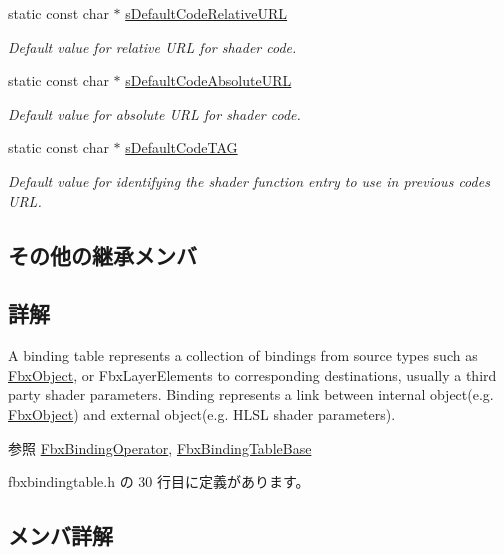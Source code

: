 \begin{DoxyCompactItemize}
static const char $\ast$ \hyperlink{class_fbx_binding_table_ac40c0a63d26e730175dfac64a58a8332}{s\+Default\+Code\+Relative\+U\+RL}
\begin{DoxyCompactList}\small\item\em Default value for relative U\+RL for shader code. \end{DoxyCompactList}\item 
static const char $\ast$ \hyperlink{class_fbx_binding_table_aa2ed12fb4230daa72892ec1ab6ee0c86}{s\+Default\+Code\+Absolute\+U\+RL}
\begin{DoxyCompactList}\small\item\em Default value for absolute U\+RL for shader code. \end{DoxyCompactList}\item 
static const char $\ast$ \hyperlink{class_fbx_binding_table_ac0dcff3f0d4d89f84814890e57e21452}{s\+Default\+Code\+T\+AG}
\begin{DoxyCompactList}\small\item\em Default value for identifying the shader function entry to use in previous code\textquotesingle{}s U\+RL. \end{DoxyCompactList}\end{DoxyCompactItemize}
\subsection*{その他の継承メンバ}


\subsection{詳解}
A binding table represents a collection of bindings from source types such as \hyperlink{class_fbx_object}{Fbx\+Object}, or Fbx\+Layer\+Elements to corresponding destinations, usually a third party shader parameters. Binding represents a link between internal object(e.\+g. \hyperlink{class_fbx_object}{Fbx\+Object}) and external object(e.\+g. H\+L\+SL shader parameters).

\begin{DoxySeeAlso}{参照}
\hyperlink{class_fbx_binding_operator}{Fbx\+Binding\+Operator}, \hyperlink{class_fbx_binding_table_base}{Fbx\+Binding\+Table\+Base} 
\end{DoxySeeAlso}


 fbxbindingtable.\+h の 30 行目に定義があります。



\subsection{メンバ詳解}
\mbox{\label{class_fbx_binding_table_a43a42110f701adae3164558d1b001275}} 
